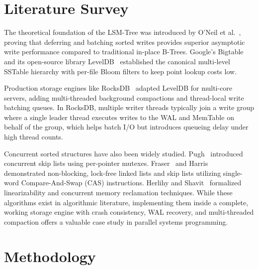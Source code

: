 \documentclass[conference]{IEEEtran}
\begin{document}
\section{Literature Survey}
The theoretical foundation of the LSM-Tree was introduced by O'Neil et al.~\cite{b3}, proving that deferring and batching sorted writes provides superior asymptotic write performance compared to traditional in-place B-Trees. Google's Bigtable~\cite{b4} and its open-source library LevelDB~\cite{b5} established the canonical multi-level SSTable hierarchy with per-file Bloom filters to keep point lookup costs low.

Production storage engines like RocksDB~\cite{b6} adapted LevelDB for multi-core servers, adding multi-threaded background compactions and thread-local write batching queues. In RocksDB, multiple writer threads typically join a write group where a single leader thread executes writes to the WAL and MemTable on behalf of the group, which helps batch I/O but introduces queueing delay under high thread counts.

Concurrent sorted structures have also been widely studied. Pugh~\cite{b7} introduced concurrent skip lists using per-pointer mutexes. Fraser~\cite{b8} and Harris~\cite{b9} demonstrated non-blocking, lock-free linked lists and skip lists utilizing single-word Compare-And-Swap (CAS) instructions. Herlihy and Shavit~\cite{b10} formalized linearizability and concurrent memory reclamation techniques. While these algorithms exist in algorithmic literature, implementing them inside a complete, working storage engine with crash consistency, WAL recovery, and multi-threaded compaction offers a valuable case study in parallel systems programming.

\section{Methodology}
\end{document}

